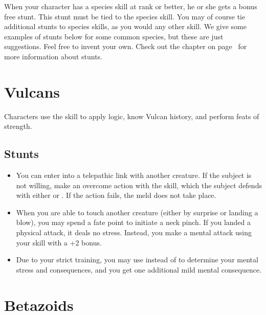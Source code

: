 \documentclass[12pt,titlepage,openany]{book}
\begin{document}
When your character has a species skill at rank  or better, he or
she gets a bonus free stunt. This stunt must be tied to the species skill. You
may of course tie additional stunts to species skills, as you would any other
skill. We give some examples of stunts below for some common species, but these
are just suggestions. Feel free to invent your own. Check out the
 chapter on page~\pageref{chap:stunts} for more
information about stunts.

\section{Vulcans}\label{sec:vulcans}

Characters use the  skill to apply logic, know Vulcan history,
and perform feats of strength.

\subsection*{ Stunts}\label{subsec:vulcan-powers}

\begin{itemize}
    \item {} You can enter into a telepathic link with another
        creature. If the subject is not willing, make an overcome action with
        the  skill, which the subject defends with either
         or . If the action fails, the meld does not
        take place.

    \item {} When you are able to touch another creature
        (either by surprise or landing a blow), you may spend a fate point to
        initiate a neck pinch. If you landed a physical attack, it deals no
        stress. Instead, you make a mental attack using your 
        skill with a +2 bonus.

    \item {} Due to your strict training, you may use
         instead of  to determine your mental stress
        and consequences, and you get one additional mild mental consequence.
\end{itemize}

\section{Betazoids}\label{sec:betazoids}
\end{document}
